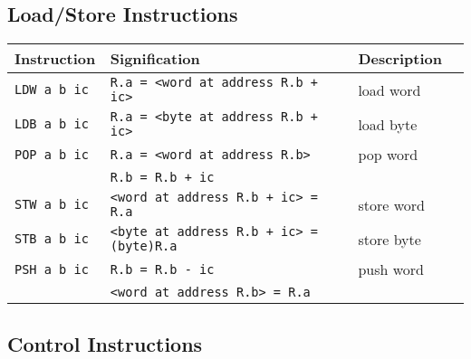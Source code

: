 \documentclass[10pt,a4paper]{article}
\begin{document}
\subsection{Load/Store Instructions}
\begin{tabular}{|l|l|l|l|}
\hline
\bf Instruction & \bf Signification & \bf Description \\ \hline \hline
\verb#LDW a b ic # & \verb#R.a = <word at address R.b + ic>       # & load word  \\ \hline
\verb#LDB a b ic # & \verb#R.a = <byte at address R.b + ic>       # & load byte  \\ \hline
\verb#POP a b ic # & \verb#R.a = <word at address R.b>            # & pop word   \\
\verb#           # & \verb#R.b = R.b + ic                         # &            \\ \hline
\verb#STW a b ic # & \verb#<word at address R.b + ic> = R.a       # & store word \\ \hline
\verb#STB a b ic # & \verb#<byte at address R.b + ic> = (byte)R.a # & store byte \\ \hline
\verb#PSH a b ic # & \verb#R.b = R.b - ic                         # & push word  \\
\verb#           # & \verb#<word at address R.b> = R.a            # &            \\ \hline
\end{tabular}
\subsection{Control Instructions}
\end{document}
